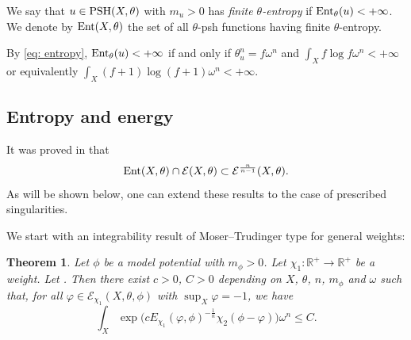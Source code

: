 \documentclass[11pt]{article}
\numberwithin{equation}{section}
\numberwithin{equation}{section}
\newtheorem{Theorem}{Theorem}[section]
\theoremstyle{plain}
\newcommand{\R}{\mathbb R}
\newcommand \psh {{\rm PSH}}
\newcommand \Ent{{\rm Ent}}
\newcommand \cE{\mathcal E }
\begin{document}
\begin{Definition}\label{def: entropy}
 We say that $u\in \psh(X, \theta)$ with $m_u>0$ has \emph{finite $\theta$-entropy} if ${\rm Ent}_\theta(u)<+\infty$. We denote by ${\rm Ent}(X, \theta)$ the set of all $\theta$-psh functions having finite $\theta$-entropy.
\end{Definition}
 By \eqref{eq: entropy}, ${\rm Ent}_\theta(u)<+\infty$ if and only if $\theta_u^n=f\omega^n$ and $\int_X f\log f\omega^n<+\infty$ or equivalently $\int_X (f+1)\log (f+1)\omega^n<+\infty$.

\setcounter{Theorem}{4}
\subsection{Entropy and energy}
It was proved in \cite{DGL20, DNL21} that \[\Ent(X,\theta)\cap \mathcal{E}(X,\theta) \subset \cE^{\frac{n}{n-1}}(X,\theta).\] As will be shown below, one can extend these results to the case of prescribed singularities.

We start with an integrability result of Moser--Trudinger type for general weights:

\begin{Theorem}
 	\label{thm: rel Moser--Trudinger inequality weight}
 	Let $\phi$ be a model potential with $m_\phi>0$. Let $\chi_1\colon \R^+\rightarrow \R^+ $ be a weight. Let . Then there exist $c>0$, $C>0$ depending on $X$, $\theta$, $n$, $m_\phi$ and $\omega$ such that, for all $\varphi\in \mathcal{E}_{\chi_1}(X,\theta, \phi)$ with $\sup_X \varphi=-1$, we have
 	\begin{equation}
 	\int_X \exp \big( c E_{\chi_1}(\varphi, \phi)^{-\frac{1}{n}} \chi_2(\phi-\varphi)\big)\omega^n \leq C.
 	\label{eq: Moser} \end{equation}
 \end{Theorem}
\end{document}

